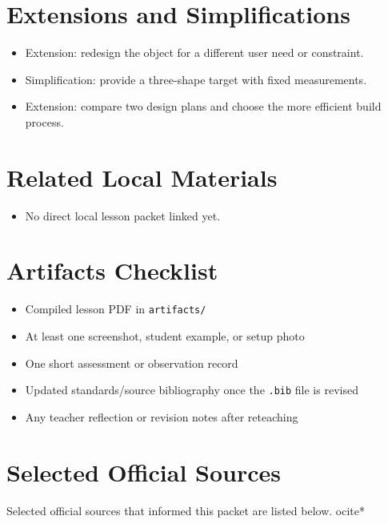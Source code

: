 \documentclass[11pt]{article}
\begin{document}
\section*{Extensions and Simplifications}
\begin{itemize}[leftmargin=*]
\item Extension: redesign the object for a different user need or constraint.
\item Simplification: provide a three-shape target with fixed measurements.
\item Extension: compare two design plans and choose the more efficient build process.
\end{itemize}

\section*{Related Local Materials}
\begin{itemize}[leftmargin=*]
\item No direct local lesson packet linked yet.
\end{itemize}

\section*{Artifacts Checklist}
\begin{itemize}[leftmargin=*]
\item Compiled lesson PDF in \texttt{artifacts/}
\item At least one screenshot, student example, or setup photo
\item One short assessment or observation record
\item Updated standards/source bibliography once the \texttt{.bib} file is revised
\item Any teacher reflection or revision notes after reteaching
\end{itemize}

\section*{Selected Official Sources}
Selected official sources that informed this packet are listed below.
ocite{*}



\end{document}
